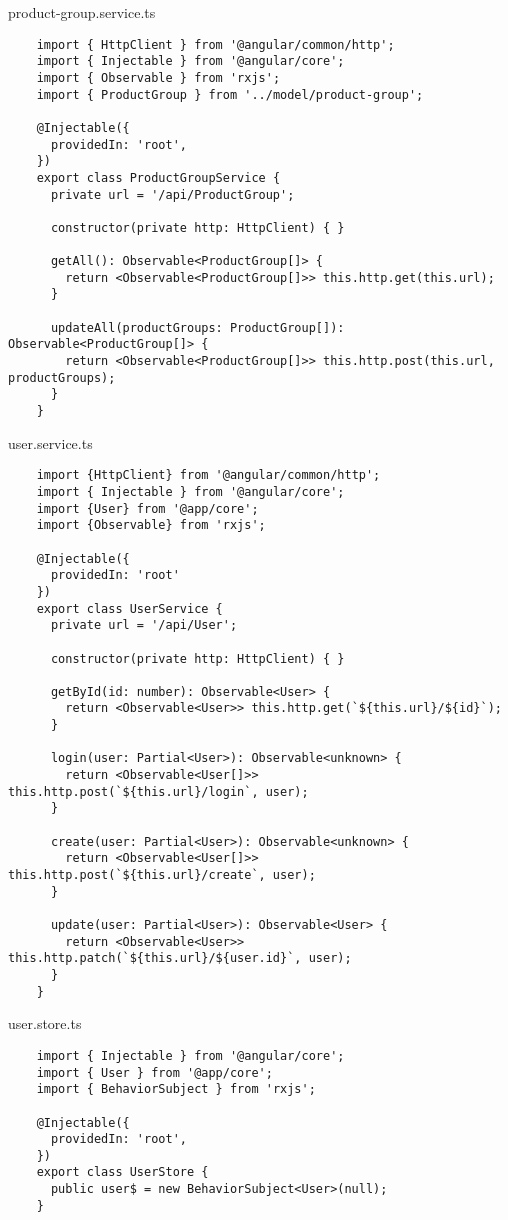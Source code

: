 product-group.service.ts
\lstset{style=ts}
\begin{lstlisting}
    import { HttpClient } from '@angular/common/http';
    import { Injectable } from '@angular/core';
    import { Observable } from 'rxjs';
    import { ProductGroup } from '../model/product-group';
    
    @Injectable({
      providedIn: 'root',
    })
    export class ProductGroupService {
      private url = '/api/ProductGroup';
    
      constructor(private http: HttpClient) { }
    
      getAll(): Observable<ProductGroup[]> {
        return <Observable<ProductGroup[]>> this.http.get(this.url);
      }
    
      updateAll(productGroups: ProductGroup[]): Observable<ProductGroup[]> {
        return <Observable<ProductGroup[]>> this.http.post(this.url, productGroups);
      }
    }
\end{lstlisting}

user.service.ts
\lstset{style=ts}
\begin{lstlisting}
    import {HttpClient} from '@angular/common/http';
    import { Injectable } from '@angular/core';
    import {User} from '@app/core';
    import {Observable} from 'rxjs';
    
    @Injectable({
      providedIn: 'root'
    })
    export class UserService {
      private url = '/api/User';
    
      constructor(private http: HttpClient) { }
    
      getById(id: number): Observable<User> {
        return <Observable<User>> this.http.get(`${this.url}/${id}`);
      }
    
      login(user: Partial<User>): Observable<unknown> {
        return <Observable<User[]>> this.http.post(`${this.url}/login`, user);
      }
    
      create(user: Partial<User>): Observable<unknown> {
        return <Observable<User[]>> this.http.post(`${this.url}/create`, user);
      }
    
      update(user: Partial<User>): Observable<User> {
        return <Observable<User>> this.http.patch(`${this.url}/${user.id}`, user);
      }
    }    
\end{lstlisting}

user.store.ts
\lstset{style=ts}
\begin{lstlisting}
    import { Injectable } from '@angular/core';
    import { User } from '@app/core';
    import { BehaviorSubject } from 'rxjs';
    
    @Injectable({
      providedIn: 'root',
    })
    export class UserStore {
      public user$ = new BehaviorSubject<User>(null);
    }    
\end{lstlisting}

